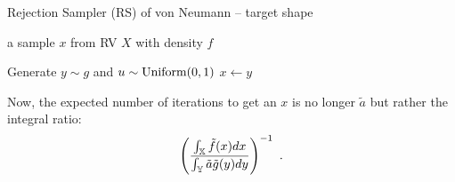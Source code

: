 \begin{algorithm}
\caption{Rejection Sampler (RS) of von Neumann -- target shape}
\label{A:RS2}
\begin{algorithmic}[1]
 a sample $x$ from RV $X$ with density $f$

\REPEAT
\STATE Generate $y \sim g$ and $u \sim \mbox{{\rm Uniform}}(0,1)$
 $x \gets y$
\end{algorithmic}
\end{algorithm}
Now, the expected number of iterations to get an $x$ is no longer $\tilde{a}$ but rather the integral ratio: $$ \left( \frac{\int_{\mathbb{X}} \tilde{f}(x) dx }{\int_{\mathbb{Y}} \tilde{a} \tilde{g}(y) dy} \right)^{-1} \ .$$

%

